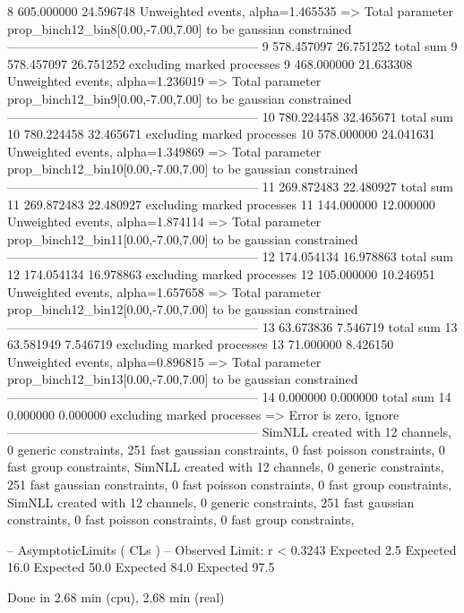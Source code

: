 8          605.000000      24.596748       Unweighted events, alpha=1.465535
  => Total parameter prop_binch12_bin8[0.00,-7.00,7.00] to be gaussian constrained
------------------------------------------------------------
9          578.457097      26.751252       total sum                     
9          578.457097      26.751252       excluding marked processes    
9          468.000000      21.633308       Unweighted events, alpha=1.236019
  => Total parameter prop_binch12_bin9[0.00,-7.00,7.00] to be gaussian constrained
------------------------------------------------------------
10         780.224458      32.465671       total sum                     
10         780.224458      32.465671       excluding marked processes    
10         578.000000      24.041631       Unweighted events, alpha=1.349869
  => Total parameter prop_binch12_bin10[0.00,-7.00,7.00] to be gaussian constrained
------------------------------------------------------------
11         269.872483      22.480927       total sum                     
11         269.872483      22.480927       excluding marked processes    
11         144.000000      12.000000       Unweighted events, alpha=1.874114
  => Total parameter prop_binch12_bin11[0.00,-7.00,7.00] to be gaussian constrained
------------------------------------------------------------
12         174.054134      16.978863       total sum                     
12         174.054134      16.978863       excluding marked processes    
12         105.000000      10.246951       Unweighted events, alpha=1.657658
  => Total parameter prop_binch12_bin12[0.00,-7.00,7.00] to be gaussian constrained
------------------------------------------------------------
13         63.673836       7.546719        total sum                     
13         63.581949       7.546719        excluding marked processes    
13         71.000000       8.426150        Unweighted events, alpha=0.896815
  => Total parameter prop_binch12_bin13[0.00,-7.00,7.00] to be gaussian constrained
------------------------------------------------------------
14         0.000000        0.000000        total sum                     
14         0.000000        0.000000        excluding marked processes    
  => Error is zero, ignore      
------------------------------------------------------------
SimNLL created with 12 channels, 0 generic constraints, 251 fast gaussian constraints, 0 fast poisson constraints, 0 fast group constraints, 
SimNLL created with 12 channels, 0 generic constraints, 251 fast gaussian constraints, 0 fast poisson constraints, 0 fast group constraints, 
SimNLL created with 12 channels, 0 generic constraints, 251 fast gaussian constraints, 0 fast poisson constraints, 0 fast group constraints, 

 -- AsymptoticLimits ( CLs ) --
Observed Limit: r < 0.3243
Expected  2.5%
Expected 16.0%
Expected 50.0%
Expected 84.0%
Expected 97.5%

Done in 2.68 min (cpu), 2.68 min (real)
